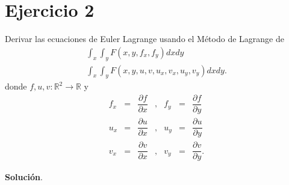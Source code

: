 \documentclass[11pt,letterpaper]{article}
\theoremstyle{definition}
\theoremstyle{definition}
\theoremstyle{definition}
\begin{document}
\section*{Ejercicio 2}
\begin{shaded*}
	Derivar las ecuaciones de Euler Lagrange usando el Método de Lagrange de
	\begin{eqnarray}
		\int_x \int_y F (x,y,f_x, f_y) dx dy \\
		\int_x \int_y F (x,y,u, v, u_x, v_x, u_y,v_y) dx dy.
	\end{eqnarray}
	donde $ f, u, v : \mathbb{R}^2 \to \mathbb{R} $ y 
	\begin{equation*}
		\begin{matrix}
			f_x & = & \dfrac{\partial f}{\partial x} & , & f_y & = & \dfrac{\partial f}{\partial y} \\
			u_x & = & \dfrac{\partial u}{\partial x} & , & u_y & = & \dfrac{\partial u}{\partial y} \\
			v_x & = & \dfrac{\partial v}{\partial x} & , & v_y & = & \dfrac{\partial v}{\partial y}.
		\end{matrix}
	\end{equation*}
\end{shaded*}
\textbf{Solución}. 
\end{document}
